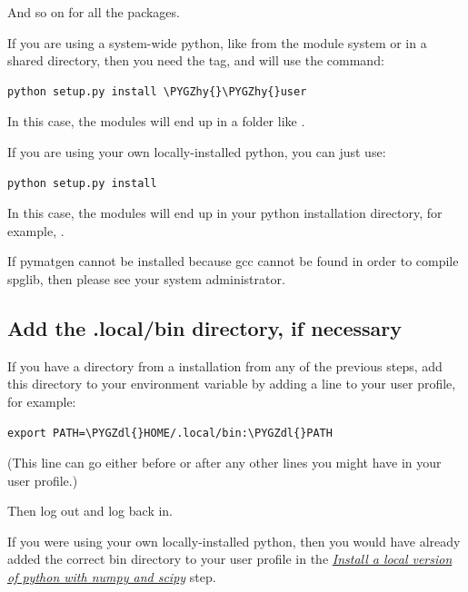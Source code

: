 \documentclass[letterpaper,10pt,english]{sphinxmanual}
\def\PYGZdl{\char`\$}
\def\PYGZhy{\char`\-}
\begin{document}
And so on for all the packages.

If you are using a system-wide python, like from the module system or in a shared directory, then you need the  tag, and will use the command:

\begin{Verbatim}[commandchars=\\\{\}]
python setup.py install \PYGZhy{}\PYGZhy{}user
\end{Verbatim}

In this case, the modules will end up in a folder like .

If you are using your own locally-installed python, you can just use:

\begin{Verbatim}[commandchars=\\\{\}]
python setup.py install
\end{Verbatim}

In this case, the modules will end up in your python installation directory, for example, .

If pymatgen cannot be installed because gcc cannot be found in order to compile spglib, then please see your system administrator.


\subsection{Add the .local/bin directory, if necessary}
\label{1_0_installation:add-local-bin}\label{1_0_installation:add-the-local-bin-directory-if-necessary}
If you have a  directory from a  installation from any of the previous steps, add this directory to your  environment variable by adding a line to your user profile, for example:

\begin{Verbatim}[commandchars=\\\{\}]
export PATH=\PYGZdl{}HOME/.local/bin:\PYGZdl{}PATH
\end{Verbatim}

(This line can go either before or after any other  lines you might have in your user profile.)

Then log out and log back in.

If you were using your own locally-installed python, then you would have already added the correct bin directory to your user profile in the {\hyperref[1_0_installation:install-local-python]{\emph{Install a local version of python with numpy and scipy}}} step.
\end{document}
